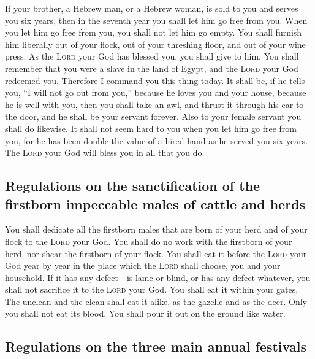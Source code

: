  If your brother, a Hebrew man, or a Hebrew woman, is
sold to you and serves you six years, then in the seventh year you shall
let him go free from you.  When you let him go free from
you, you shall not let him go empty.  You shall furnish
him liberally out of your flock, out of your threshing floor, and out of
your wine press. As the \textsc{Lord} your God has blessed you, you
shall give to him.  You shall remember that you were a
slave in the land of Egypt, and the \textsc{Lord} your God redeemed you.
Therefore I command you this thing today.  It shall be,
if he tells you, ``I will not go out from you,'' because he loves you
and your house, because he is well with you,  then you
shall take an awl, and thrust it through his ear to the door, and he
shall be your servant forever. Also to your female servant you shall do
likewise.  It shall not seem hard to you when you let him
go free from you, for he has been double the value of a hired hand as he
served you six years. The \textsc{Lord} your God will bless you in all
that you do.

\hypertarget{regulations-on-the-sanctification-of-the-firstborn-impeccable-males-of-cattle-and-herds}{%
\subsection{Regulations on the sanctification of the firstborn
impeccable males of cattle and
herds}\label{regulations-on-the-sanctification-of-the-firstborn-impeccable-males-of-cattle-and-herds}}

 You shall dedicate all the firstborn males that are born
of your herd and of your flock to the \textsc{Lord} your God. You shall
do no work with the firstborn of your herd, nor shear the firstborn of
your flock.  You shall eat it before the \textsc{Lord}
your God year by year in the place which the \textsc{Lord} shall choose,
you and your household.  If it has any defect---is lame
or blind, or has any defect whatever, you shall not sacrifice it to the
\textsc{Lord} your God.  You shall eat it within your
gates. The unclean and the clean shall eat it alike, as the gazelle and
as the deer.  Only you shall not eat its blood. You shall
pour it out on the ground like water.

\hypertarget{regulations-on-the-three-main-annual-festivals}{%
\subsection{Regulations on the three main annual
festivals}\label{regulations-on-the-three-main-annual-festivals}}

